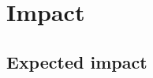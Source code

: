 \documentclass[11pt, a4paper]{article} %
\begin{document}

\section{Impact}

\subsection{Expected impact} 
\end{document}
